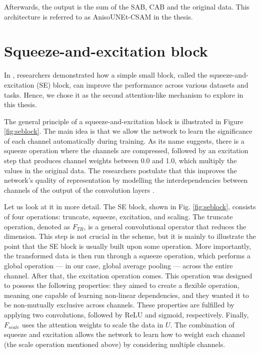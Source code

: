 \documentclass[
  digital,     %
  oneside,     %
  nosansbold,  %
  nocolorbold, %
  lof,         %
  lot,         %
]{fithesis4}
\begin{document}
Afterwards, the output is the sum of the SAB, CAB and the original data. This architecture is referred to as AnisoUNEt-CSAM in the thesis.

\section{Squeeze-and-excitation block}
\label{sec-seblock}

In \parencite{Hu2018}, researchers demonstrated how a simple small block, called the squeeze-and-excitation (SE) block, can improve the performance across various datasets and tasks. Hence, we chose it as the second attention-like mechanism to explore in this thesis.

The general principle of a squeeze-and-excitation block is illustrated in Figure \ref{fig:seblock}. The main idea is that we allow the network to learn the significance of each channel automatically during training. As its name suggests, there is a squeeze operation where the channels are compressed, followed by an excitation step that produces channel weights between 0.0 and 1.0, which multiply the values in the original data. The researchers postulate that this improves the network's quality of representation by modelling the interdependencies between channels of the output of the convolution layers \parencite{Hu2018}.

Let us look at it in more detail. The SE block, shown in Fig. \ref{fig:seblock}, consists of four operations: truncate, squeeze, excitation, and scaling. The truncate operation, denoted as $F_{TR}$, is a general convolutional operator that reduces the dimension. This step is not crucial in the scheme, but it is mainly to illustrate the point that the SE block is usually built upon some operation. More importantly, the transformed data is then run through a squeeze operation, which performs a global operation --- in our case, global average pooling --- across the entire channel. After that, the excitation operation comes. This operation was designed to possess the following properties: they aimed to create a flexible operation, meaning one capable of learning non-linear dependencies, and they wanted it to be non-mutually exclusive across channels. These properties are fulfilled by applying two convolutions, followed by ReLU and sigmoid, respectively. Finally, $F_{scale}$ uses the attention weights to scale the data in $U$. The combination of squeeze and excitation allows the network to learn how to weight each channel (the scale operation mentioned above) by considering multiple channels.
\end{document}
